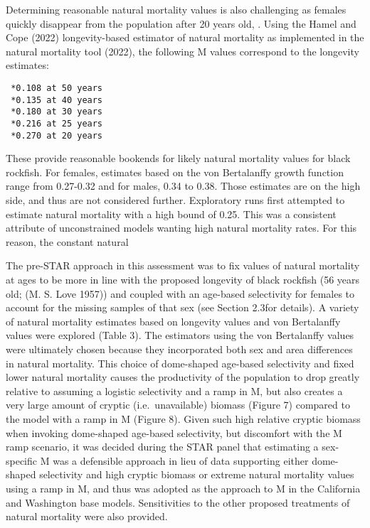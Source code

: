 \documentclass[11pt,
  english,
  letterpaper,
]{article}
\begin{document}
Determining reasonable natural mortality values is also challenging as females quickly disappear from the population after 20 years old, . Using the Hamel and Cope (2022) longevity-based estimator of natural mortality as implemented in the natural mortality tool (2022), the following M values correspond to the longevity estimates:

\begin{verbatim}
 *0.108 at 50 years
 *0.135 at 40 years
 *0.180 at 30 years
 *0.216 at 25 years
 *0.270 at 20 years
\end{verbatim}

These provide reasonable bookends for likely natural mortality values for black rockfish. For females, estimates based on the von Bertalanffy growth function range from 0.27-0.32 and for males, 0.34 to 0.38. Those estimates are on the high side, and thus are not considered further. Exploratory runs first attempted to estimate natural mortality with a high bound of 0.25. This was a consistent attribute of unconstrained models wanting high natural mortality rates. For this reason, the constant natural

The pre-STAR approach in this assessment was to fix values of natural mortality at ages to be more in line with the proposed longevity of black rockfish (56 years old; (M. S. Love 1957)) and coupled with an age-based selectivity for females to account for the missing samples of that sex (see Section 2.3for details). A variety of natural mortality estimates based on longevity values and von Bertalanffy values were explored (Table 3). The estimators using the von Bertalanffy values were ultimately chosen because they incorporated both sex and area differences in natural mortality. This choice of dome-shaped age-based selectivity and fixed lower natural mortality causes the productivity of the population to drop greatly relative to assuming a logistic selectivity and a ramp in M, but also creates a very large amount of cryptic (i.e.~unavailable) biomass (Figure 7) compared to the model with a ramp in M (Figure 8). Given such high relative cryptic biomass when invoking dome-shaped age-based selectivity, but discomfort with the M ramp scenario, it was decided during the STAR panel that estimating a sex-specific M was a defensible approach in lieu of data supporting either dome-shaped selectivity and high cryptic biomass or extreme natural mortality values using a ramp in M, and thus was adopted as the approach to M in the California and Washington base models. Sensitivities to the other proposed treatments of natural mortality were also provided.
\end{document}
